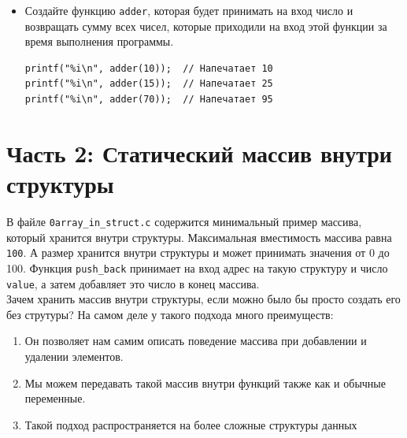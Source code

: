 \documentclass{article}
\begin{document}
\begin{itemize}
\item Создайте функцию \texttt{adder}, которая будет принимать на вход число и возвращать сумму всех чисел, которые приходили на вход этой функции за время выполнения программы.
\begin{lstlisting}
printf("%i\n", adder(10));  // Напечатает 10
printf("%i\n", adder(15));  // Напечатает 25
printf("%i\n", adder(70));  // Напечатает 95
\end{lstlisting}
\end{itemize}

\newpage
\section*{Часть 2: Статический массив внутри структуры}
В файле \texttt{0array\_in\_struct.c} содержится минимальный пример массива, который хранится внутри структуры. Максимальная вместимость массива равна \texttt{100}. А размер хранится внутри структуры и может принимать значения от 0 до 100. Функция \texttt{push\_back} принимает на вход адрес на такую структуру и число \texttt{value}, а затем добавляет это число в конец массива.\\

Зачем хранить массив внутри структуры, если можно было бы просто создать его без струтуры? На самом деле у такого подхода много преимуществ:
\begin{enumerate}
\item Он позволяет нам самим описать поведение массива при добавлении и удалении элементов.
\item Мы можем передавать такой массив внутри функций также как и обычные переменные.
\item Такой подход распространяется на более сложные структуры данных
\end{enumerate}
\end{document}
